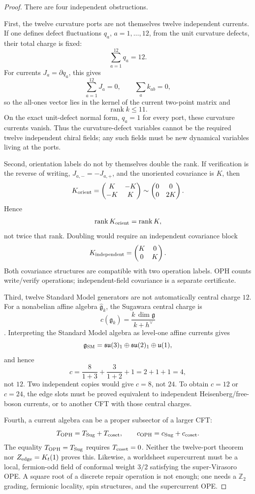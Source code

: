 \documentclass[11pt]{article}
\theoremstyle{remark}
\theoremstyle{plain}
\newcommand{\OPH}{\mathrm{OPH}}
\newcommand{\Z}{\mathbb Z}
\begin{document}
\begin{proof}
There are four independent obstructions.

First, the twelve curvature ports are not themselves twelve independent currents. If one defines
defect fluctuations \(q_a\), \(a=1,\ldots,12\), from the unit curvature defects, their total charge
is fixed:
\[
\sum_{a=1}^{12}q_a=12.
\]
For currents \(J_a=\partial q_a\), this gives
\[
\sum_{a=1}^{12}J_a=0,
\qquad
\sum_a k_{ab}=0,
\]
so the all-ones vector lies in the kernel of the current two-point matrix and
\[
\operatorname{rank}k\le 11.
\]
On the exact unit-defect normal form, \(q_a=1\) for every port, these curvature currents vanish.
Thus the curvature-defect variables cannot be the required twelve independent chiral fields; any
such fields must be new dynamical variables living at the ports.

Second, orientation labels do not by themselves double the rank. If verification is the reverse of
writing, \(J_{a,-}=-J_{a,+}\), and the unoriented covariance is \(K\), then
\[
K_{\rm orient}=
\begin{pmatrix}
K&-K\\
-K&K
\end{pmatrix}
\sim
\begin{pmatrix}
0&0\\
0&2K
\end{pmatrix}.
\]
Hence
\[
\operatorname{rank}K_{\rm orient}=\operatorname{rank}K,
\]
not twice that rank. Doubling would require an independent covariance block
\[
K_{\rm independent}=
\begin{pmatrix}
K&0\\
0&K
\end{pmatrix}.
\]
Both covariance structures are compatible with two operation labels. OPH counts write/verify
operations; independent-field covariance is a separate certificate.

Third, twelve Standard Model generators are not automatically central charge \(12\). For a
nonabelian affine algebra \(\widehat{\mathfrak g}_k\), the Sugawara central charge is
\[
c(\mathfrak g_k)=\frac{k\,\dim\mathfrak g}{k+h^\vee}
\]
\cite{DiFrancescoCFT}. Interpreting the Standard Model algebra as level-one affine currents gives
\[
\mathfrak g_{\rm SM}
=
\mathfrak{su}(3)_1\oplus\mathfrak{su}(2)_1\oplus\mathfrak u(1),
\]
and hence
\[
c=\frac{8}{1+3}+\frac{3}{1+2}+1=2+1+1=4,
\]
not \(12\). Two independent copies would give \(c=8\), not \(24\). To obtain \(c=12\) or \(c=24\),
the edge slots must be proved equivalent to independent Heisenberg/free-boson currents, or to
another CFT with those central charges.

Fourth, a current algebra can be a proper subsector of a larger CFT:
\[
T_{\OPH}=T_{\rm Sug}+T_{\rm coset},
\qquad
c_{\OPH}=c_{\rm Sug}+c_{\rm coset}.
\]
The equality \(T_{\OPH}=T_{\rm Sug}\) requires \(T_{\rm coset}=0\). Neither the twelve-port theorem
nor \(Z_{\rm edge}=K_t(1)\) proves this. Likewise, a worldsheet supercurrent must be a local,
fermion-odd field of conformal weight \(3/2\) satisfying the super-Virasoro OPE. A square root of a
discrete repair operation is not enough; one needs a \(\Z_2\) grading, fermionic locality, spin
structures, and the supercurrent OPE.
\end{proof}
\end{document}
